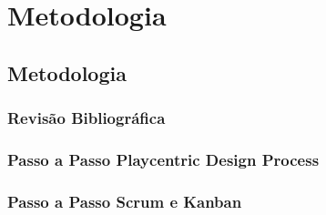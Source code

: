 \part{Metodologia}

\chapter[Metodologia]{Metodologia}



\section{Revisão Bibliográfica}



\section{Passo a Passo Playcentric Design Process}



\section{Passo a Passo Scrum e Kanban}

